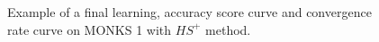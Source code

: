 \begin{appendices}
\begin{figure}[H]
\begin{subfigure}{0.40\textwidth}
                    \label{fig:monks_1_ACC_CGD}
                \end{subfigure}
                \begin{subfigure}{0.40\textwidth}
                    \caption{}
                    \label{fig:monks_1_NORM_CGD}
                \end{subfigure}
                \caption{Example of a final learning, accuracy score curve and
                convergence rate curve on MONKS 1 with $HS^+$ method.}
                \label{fig:monks_1_CGD}
            \end{figure}


\end{appendices}
